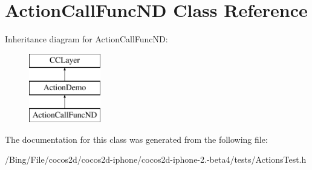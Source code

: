 \hypertarget{interface_action_call_func_n_d}{\section{Action\-Call\-Func\-N\-D Class Reference}
\label{interface_action_call_func_n_d}
}
Inheritance diagram for Action\-Call\-Func\-N\-D\-:\begin{figure}[H]
\begin{center}
\leavevmode
\includegraphics[height=3.000000cm]{interface_action_call_func_n_d}
\end{center}
\end{figure}


The documentation for this class was generated from the following file\-:\begin{DoxyCompactItemize}
\item 
/\-Bing/\-File/cocos2d/cocos2d-\/iphone/cocos2d-\/iphone-\/2.-\/beta4/tests/Actions\-Test.\-h\end{DoxyCompactItemize}

